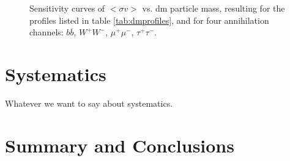 \documentclass{article}
\begin{document}
\begin{figure}
\endminipage
  \caption{Sensitivity curves of $<\sigma v >$ vs. \gls{dm} particle mass, resulting for the profiles listed in table \ref{tab:dmprofiles}, and for four annihilation channels: $b\overline b$, $W^+W^-$, $\mu^+ \mu^-$, $\tau^+ \tau^-$.}
    \label{fig:dmsensicurves}
\end{figure}

\section{Systematics} \label{sec:systematics}
Whatever we want to say about systematics.
\section{Summary and Conclusions} \label{sec:conclusions}
\end{document}
